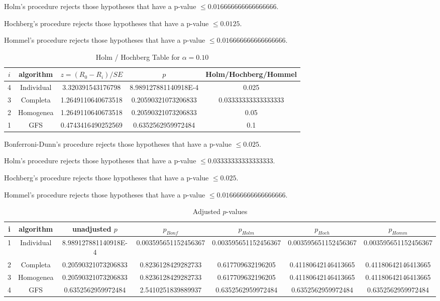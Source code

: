 \documentclass[a4paper,10pt]{article}
\begin{document}
\begin{landscape}
Holm's procedure rejects those hypotheses that have a p-value $\le0.016666666666666666$.


Hochberg's procedure rejects those hypotheses that have a p-value $\le0.0125$.


Hommel's procedure rejects those hypotheses that have a p-value $\le0.016666666666666666$.


\begin{table}[!htp]
\centering\tiny
\caption{Holm / Hochberg Table for $\alpha=0.10$}
\begin{tabular}{ccccc}
$i$&algorithm&$z=(R_0 - R_i)/SE$&$p$&Holm/Hochberg/Hommel\\
\hline
4&Individual&3.320391543176798&8.989127881140918E-4&0.025\\
3&Completa&1.2649110640673518&0.20590321073206833&0.03333333333333333\\
2&Homogenea&1.2649110640673518&0.20590321073206833&0.05\\
1&GFS&0.4743416490252569&0.6352562959972484&0.1\\
\hline
\end{tabular}
\end{table}
Bonferroni-Dunn's procedure rejects those hypotheses that have a p-value $\le0.025$.


Holm's procedure rejects those hypotheses that have a p-value $\le0.03333333333333333$.


Hochberg's procedure rejects those hypotheses that have a p-value $\le0.025$.


Hommel's procedure rejects those hypotheses that have a p-value $\le0.016666666666666666$.


\begin{table}[!htp]
\centering\tiny
\caption{Adjusted $p$-values}
\begin{tabular}{ccccccc}
i&algorithm&unadjusted $p$&$p_{Bonf}$&$p_{Holm}$&$p_{Hoch}$&$p_{Homm}$\\
\hline
1&Individual&8.989127881140918E-4&0.003595651152456367&0.003595651152456367&0.003595651152456367&0.003595651152456367\\
2&Completa&0.20590321073206833&0.8236128429282733&0.617709632196205&0.41180642146413665&0.41180642146413665\\
3&Homogenea&0.20590321073206833&0.8236128429282733&0.617709632196205&0.41180642146413665&0.41180642146413665\\
4&GFS&0.6352562959972484&2.5410251839889937&0.6352562959972484&0.6352562959972484&0.6352562959972484\\
\hline
\end{tabular}
\end{table}


\end{landscape}
\end{document}
